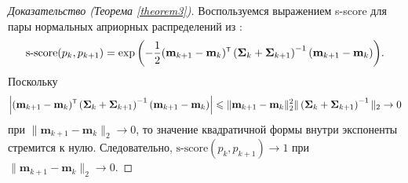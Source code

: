 \begin{proof}[Доказательство (Теорема \ref{theorem3})]
    Воспользуемся выражением s-score для пары нормальных априорных распределений из \cite{Aduenko2017}:
    \[ \text{s-score}(p_k, p_{k+1}) = \exp{\left( -\dfrac{1}{2} (\mathbf{m}_{k+1} - \mathbf{m}_k)\T \left( \mathbf{\Sigma}_k + \mathbf{\Sigma}_{k+1} \right)^{-1} (\mathbf{m}_{k+1} - \mathbf{m}_k) \right)}. \]
    Поскольку
    \[ \left| (\mathbf{m}_{k+1} - \mathbf{m}_k)\T \left( \mathbf{\Sigma}_k + \mathbf{\Sigma}_{k+1} \right)^{-1} (\mathbf{m}_{k+1} - \mathbf{m}_k) \right| \leqslant \| \mathbf{m}_{k+1} - \mathbf{m}_k \|_2^2 \| \left( \mathbf{\Sigma}_k + \mathbf{\Sigma}_{k+1} \right)^{-1} \|_2 \to 0 \]
    при $\| \mathbf{m}_{k+1} - \mathbf{m}_k \|_2 \to 0$, то значение квадратичной формы внутри экспоненты стремится к нулю. Следовательно, $\text{s-score}(p_k, p_{k+1}) \to 1$ при $\| \mathbf{m}_{k+1} - \mathbf{m}_k \|_2 \to 0$.
\end{proof}

